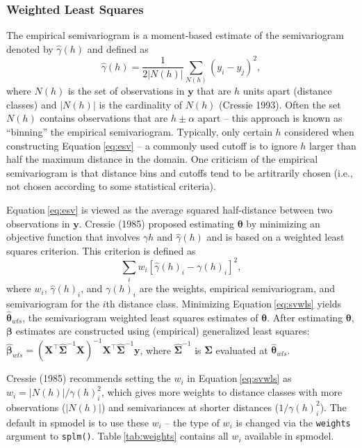 \documentclass{article}
\begin{document}
\hypertarget{weighted-least-squares}{%
\subsubsection{Weighted Least Squares}\label{weighted-least-squares}}

The empirical semivariogram is a moment-based estimate of the
semivariogram denoted by \(\hat{\gamma}(h)\) and defined as
\begin{equation}\label{eq:esv}
  \hat{\gamma}(h) = \frac{1}{2|N(h)|} \sum_{N(h)} (y_i - y_j)^2, 
\end{equation} where \(N(h)\) is the set of observations in
\(\mathbf{y}\) that are \(h\) units apart (distance classes) and
\(|N(h)|\) is the cardinality of \(N(h)\) (Cressie 1993). Often the set
\(N(h)\) contains observations that are \(h \pm \alpha\) apart -- this
approach is known as ``binning'' the empirical semivariogram. Typically,
only certain \(h\) considered when constructing
Equation\(~\)\ref{eq:esv} -- a commonly used cutoff is to ignore \(h\)
larger than half the maximum distance in the domain. One criticism of
the empirical semivariogram is that distance bins and cutoffs tend to be
artitrarily chosen (i.e., not chosen according to some statistical
criteria).

Equation\(~\)\eqref{eq:esv} is viewed as the average squared
half-distance between two observations in \(\mathbf{y}\). Cressie (1985)
proposed estimating \(\bm{\theta}\) by minimizing an objective function
that involves \(\gamma{h}\) and \(\hat{\gamma}(h)\) and is based on a
weighted least squares criterion. This criterion is defined as
\begin{equation}\label{eq:svwls}
  \sum_i w_i [\hat{\gamma}(h)_i - \gamma(h)_i]^2,
\end{equation} where \(w_i\), \(\hat{\gamma}(h)_i\), and \(\gamma(h)_i\)
are the weights, empirical semivariogram, and semivariogram for the
\(i\)th distance class. Minimizing Equation\(~\)\eqref{eq:svwls} yields
\(\bm{\hat{\theta}}_{wls}\), the semivariogram weighted least squares
estimates of \(\bm{\theta}\). After estimating \(\bm{\theta}\),
\(\bm{\beta}\) estimates are constructed using (empirical) generalized
least squares:
\(\bm{\hat{\beta}}_{wls} = (\mathbf{X}^\intercal \hat{\mathbf{\Sigma}}^{-1} \mathbf{X})^{-1} \mathbf{X}^\intercal \hat{\mathbf{\Sigma}}^{-1} \mathbf{y}\),
where \(\hat{\mathbf{\Sigma}}^{-1}\) is \(\mathbf{\Sigma}\) evaluated at
\(\bm{\hat{\theta}}_{wls}\).

Cressie (1985) recommends setting the \(w_i\) in
Equation\(~\)\eqref{eq:svwls} as \(w_i = |N(h)| / \gamma(h)_i^2\), which
gives more weights to distance classes with more observations
(\(|N(h)|\)) and semivariances at shorter distances
(\(1 / \gamma(h)_i^2\)). The default in spmodel is to use these \(w_i\)
-- the type of \(w_i\) is changed via the \texttt{weights} argument to
\texttt{splm()}. Table\(~\)\ref{tab:weights} contains all \(w_i\)
available in spmodel.
\end{document}

